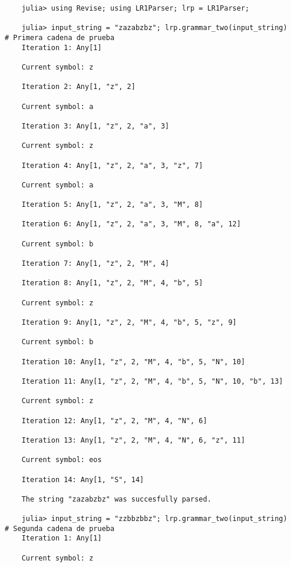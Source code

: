 \begin{verbatim}
    julia> using Revise; using LR1Parser; lrp = LR1Parser;

    julia> input_string = "zazabzbz"; lrp.grammar_two(input_string)    # Primera cadena de prueba
    Iteration 1: Any[1] 

    Current symbol: z 

    Iteration 2: Any[1, "z", 2] 

    Current symbol: a 

    Iteration 3: Any[1, "z", 2, "a", 3] 

    Current symbol: z 

    Iteration 4: Any[1, "z", 2, "a", 3, "z", 7] 

    Current symbol: a 

    Iteration 5: Any[1, "z", 2, "a", 3, "M", 8] 

    Iteration 6: Any[1, "z", 2, "a", 3, "M", 8, "a", 12] 

    Current symbol: b 

    Iteration 7: Any[1, "z", 2, "M", 4] 

    Iteration 8: Any[1, "z", 2, "M", 4, "b", 5] 

    Current symbol: z 

    Iteration 9: Any[1, "z", 2, "M", 4, "b", 5, "z", 9] 

    Current symbol: b 

    Iteration 10: Any[1, "z", 2, "M", 4, "b", 5, "N", 10] 

    Iteration 11: Any[1, "z", 2, "M", 4, "b", 5, "N", 10, "b", 13] 

    Current symbol: z 

    Iteration 12: Any[1, "z", 2, "M", 4, "N", 6] 

    Iteration 13: Any[1, "z", 2, "M", 4, "N", 6, "z", 11] 

    Current symbol: eos 

    Iteration 14: Any[1, "S", 14] 

    The string "zazabzbz" was succesfully parsed.

    julia> input_string = "zzbbzbbz"; lrp.grammar_two(input_string)    # Segunda cadena de prueba
    Iteration 1: Any[1] 

    Current symbol: z 


\end{verbatim}
